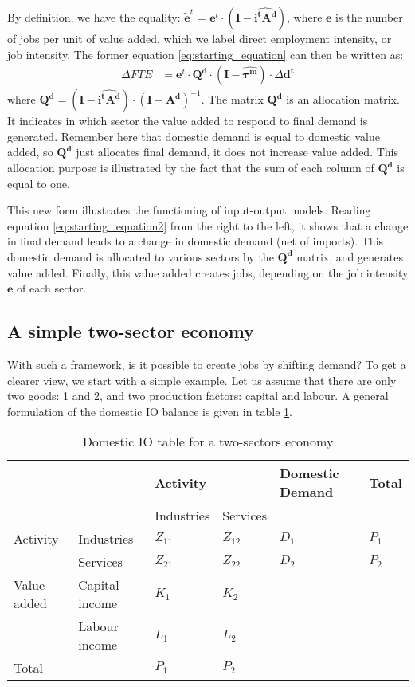 By definition, we have the equality: 
$\pmb{\tilde{e}}^t$ = $\pmb{e}^t \cdot (\pmb{I} - \widehat{\pmb{i^t A^d}}) $, where $\pmb{e}$ is the number of jobs per unit of value added, which we label direct employment intensity, or job intensity. The former equation \eqref{eq:starting_equation} can then be written as:
\begin{align}	
	\Delta FTE &=  \pmb{e}^t \cdot \pmb{Q^d} \cdot (\pmb{I} - \widehat{\pmb{\tau^m}}) \cdot \Delta \pmb{d^t}
	\label{eq:starting_equation2}
\end{align}
where  $\pmb{Q^d} = (\pmb{I} - \widehat{\pmb{i^t A^d}}) \cdot (\pmb{I} - \pmb{A^d})^{-1}$. The matrix $\pmb{Q^d}$ is an allocation matrix. It indicates in which sector the value added to respond to final demand is generated. Remember here that domestic demand is equal to domestic value added, so $\pmb{Q^d}$ just allocates final demand, it does not increase value added. This allocation purpose is illustrated by the fact that the sum of each column of $\pmb{Q^d}$ is equal to one.

This new form illustrates the functioning of input-output models. Reading equation \ref{eq:starting_equation2} from the right to the left, it shows that a change in final demand leads to a change in domestic demand (net of imports). This domestic demand is allocated to various sectors by the $\pmb{Q^d}$ matrix, and generates value added. Finally, this value added creates jobs, depending on the job intensity $\pmb{e}$ of each sector. 

\subsection{A simple two-sector economy}
With such a framework, is it possible to create jobs by shifting demand? 
To get a clearer view, we start with a simple example. Let us assume that there are only two goods: 1 and 2, and two production factors: capital and labour. 
A general formulation of the domestic IO balance is given in table \ref{tab:2x2_IO_table}.

\begin{table}
	\centering
	\caption{Domestic IO table for a two-sectors economy}
	\label{tab:2x2_IO_table}
	\begin{tabular}{llllll}
		\toprule
		&  & Activity &  & Domestic Demand & Total \\
		\midrule
		&  & Industries & Services &  &  \\
		Activity & Industries & $Z_{11}$ & $Z_{12}$ & $D_1$ & $P_1$ \\
		& Services & $Z_{21}$ & $Z_{22}$ & $D_2$ & $P_2$ \\
		Value added & Capital income & $K_1$ & $K_2$ &  &  \\
		& Labour income & $L_1$ & $L_2$ &  &  \\
		Total &  & $P_1$ & $P_2$ &  &  \\
		\bottomrule 
	\end{tabular}
\end{table}

